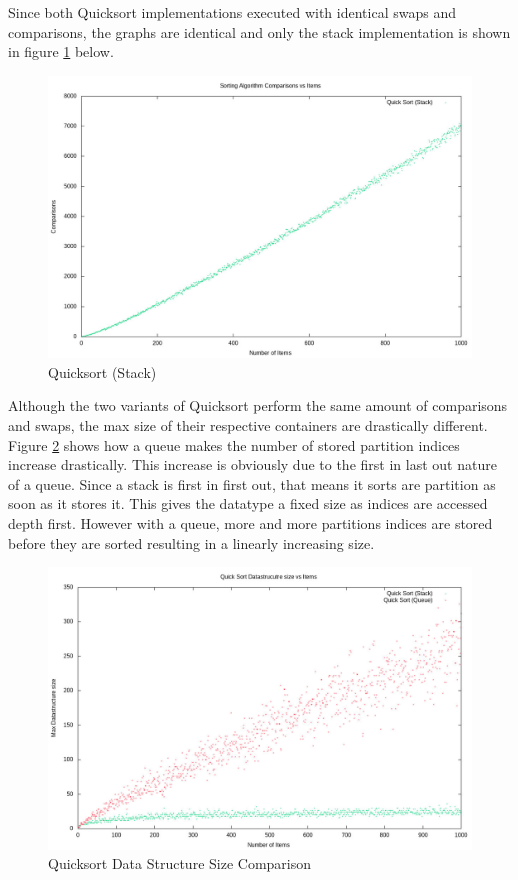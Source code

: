 \documentclass[12pt]{article}
\begin{document}
	Since both Quicksort implementations executed with identical swaps and comparisons,
	the graphs are identical and only the stack implementation is shown in figure \ref{stack} below.

	\begin{figure}[H]
		\caption{Quicksort (Stack)}\label{stack}
		\includegraphics[width=6in]{quick_stack}
		\centering
	\end{figure}

	Although the two variants of Quicksort perform the same amount of comparisons and swaps,
	the max size of their respective containers are drastically different.
	Figure \ref{quick_size} shows how a queue makes the number of stored partition indices increase drastically.
	This increase is obviously due to the first in last out nature of a queue.
	Since a stack is first in first out, that means it sorts are partition as soon as it stores it.
	This gives the datatype a fixed size as indices are accessed depth first.
	However with a queue, more and more partitions indices are stored before they are sorted resulting in a linearly increasing size.

	\begin{figure}[H]
		\caption{Quicksort Data Structure Size Comparison}\label{quick_size}
		\includegraphics[width=6in]{quick_comparison_size}
		\centering
	\end{figure}
\end{document}
